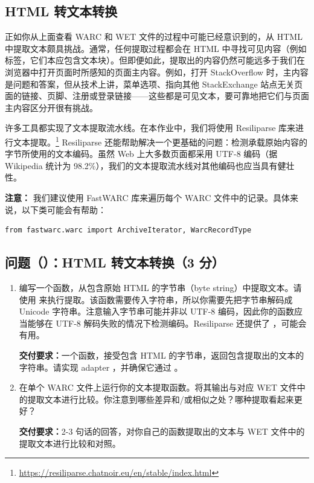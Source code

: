 \subsection{HTML 转文本转换}

正如你从上面查看 WARC 和 WET 文件的过程中可能已经意识到的，从 HTML 中提取文本颇具挑战。通常，任何提取过程都会在 HTML 中寻找可见内容（例如  标签，它们本应包含文本块）。但即便如此，提取出的内容仍然可能远多于我们在浏览器中打开页面时所感知的页面主内容。例如，打开 StackOverflow 时，主内容是问题和答案，但从技术上讲，菜单选项、指向其他 StackExchange 站点无关页面的链接、页脚、注册或登录链接——这些都是可见文本，要可靠地把它们与页面主内容区分开很有挑战。

许多工具都实现了文本提取流水线。在本作业中，我们将使用 Resiliparse 库来进行文本提取。\footnote{\url{https://resiliparse.chatnoir.eu/en/stable/index.html}} Resiliparse 还能帮助解决一个更基础的问题：检测承载原始内容的字节所使用的文本编码。虽然 Web 上大多数页面都采用 UTF-8 编码（据 Wikipedia 统计为 98.2\%），我们的文本提取流水线对其他编码也应当具有健壮性。

\textbf{注意：}
我们建议使用 FastWARC 库来遍历每个 WARC 文件中的记录。具体来说，以下类可能会有帮助：

\begin{lstlisting}
from fastwarc.warc import ArchiveIterator, WarcRecordType
\end{lstlisting}

\subsection*{问题（）：HTML 转文本转换（3 分）}

\begin{enumerate}[label=(\alph*)]
  \item 编写一个函数，从包含原始 HTML 的字节串（byte string）中提取文本。请使用  来执行提取。该函数需要传入字符串，所以你需要先把字节串解码成 Unicode 字符串。注意输入字节串可能并非以 UTF-8 编码，因此你的函数应当能够在 UTF-8 解码失败的情况下检测编码。Resiliparse 还提供了 ，可能会有用。

  \textbf{交付要求：}一个函数，接受包含 HTML 的字节串，返回包含提取出的文本的字符串。请实现 adapter ，并确保它通过 。

  \item 在单个 WARC 文件上运行你的文本提取函数。将其输出与对应 WET 文件中的提取文本进行比较。你注意到哪些差异和/或相似之处？哪种提取看起来更好？

  \textbf{交付要求：}2-3 句话的回答，对你自己的函数提取出的文本与 WET 文件中的提取文本进行比较和对照。
\end{enumerate}

